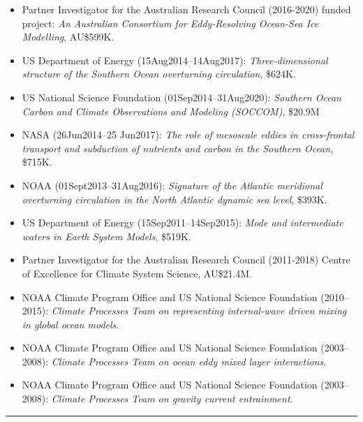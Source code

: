 \documentclass{article}
\begin{document}
\begin{itemize}[leftmargin=*]
\item Partner Investigator for the  Australian Research Council (2016-2020) funded project: {\it An Australian Consortium for Eddy-Resolving Ocean-Sea Ice Modelling}, AU\$599K.

\item US Department of Energy (15Aug2014--14Aug2017): {\it Three-dimensional structure of the Southern Ocean overturning circulation},  \$624K.

\item US National Science Foundation (01Sep2014--31Aug2020): {\it Southern Ocean Carbon and Climate Observations and Modeling (SOCCOM)}, \$20.9M

\item NASA (26Jun2014--25 Jun2017): {\it The role of mesoscale eddies in cross-frontal transport and subduction of nutrients and carbon in the Southern Ocean}, \$715K.

\item NOAA (01Sept2013--31Aug2016): {\it Signature of the Atlantic meridional overturning circulation in the North Atlantic dynamic sea level}, \$393K.

\item US Department of Energy (15Sep2011--14Sep2015): {\it Mode and intermediate waters in Earth System Models}, \$519K.

\item Partner Investigator for the Australian Research Council (2011-2018) Centre of Excellence for Climate System Science, AU\$21.4M.
  
\item NOAA Climate Program Office and US National Science Foundation (2010--2015): {\it Climate Processes Team on representing internal-wave driven mixing in global ocean models}.

\item NOAA Climate Program Office and US National Science Foundation (2003--2008): {\it Climate Processes Team on ocean eddy mixed layer interactions}.

\item NOAA Climate Program Office and US National Science Foundation (2003--2008): {\it Climate Processes Team on gravity current entrainment}.

\end{itemize}



\noindent\rule{\textwidth}{1pt}
\vspace{-1cm}
%

\end{document}
